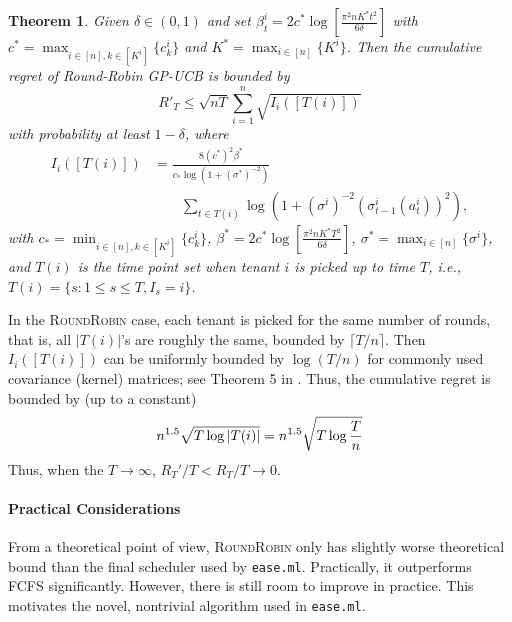 \documentclass[letterpaper]{vldb}
\newcommand{\eml}{\texttt{ease.ml}\xspace}
\newcommand{\rr}{\textsc{RoundRobin}\xspace}
\newtheorem{theorem}{Theorem}
\begin{document}
\vspace{-0.5em}
\begin{theorem}
  \label{thm:rr}
  Given $\delta\in (0,1)$ and set $\beta_t^i = 2c^\ast \log\left[\frac{\pi^2 n K^\ast t^2}{6\delta}\right]$ with $c^\ast = \max_{i\in [n], k\in [K^i]}\{c^i_k\}$ and $K^\ast = \max_{i\in [n]}\{K^i\}$. Then the
  cumulative regret of Round-Robin GP-UCB is bounded by
  \[
     R'_T \leq \sqrt{n T}\sum_{i=1}^n \sqrt{I_i([T(i)])}
  \]
  with probability at least $1-\delta$,
  where
  \begin{align*}
    I_i([T(i)]) & = \frac{8 (c^\ast)^2 \beta^\ast}{c_\ast \log(1 + (\sigma^\ast)^{-2})}\\
    &\qquad \sum_{t\in T(i)} \log\left(1 + (\sigma^i)^{-2}(\sigma^i_{t-1}(a^i_{t}))^2\right),
  \end{align*}
  with $c_\ast = \min_{i\in [n], k\in [K^i]}\{c^i_k\}$,  $\beta^\ast = 2c^\ast \log\left[\frac{\pi^2 n K^\ast T^2}{6\delta}\right]$, $\sigma^\ast= \max_{i\in [n]}\{\sigma^i\}$, and $T(i)$ is the time point set when tenant $i$ is picked up to time $T$, i.e.,
  $T(i) = \{s: 1\le s\le T, I_s = i\}$.
\end{theorem}

In the \rr case, each tenant is picked for the same number of rounds, that is, all $|T(i)|$'s are roughly the same, bounded by $\lceil T/n\rceil$. Then $I_i([T(i)])$ can be uniformly bounded by $\log (T/n)$ for commonly used covariance (kernel) matrices; see Theorem 5 in \cite{SrinivasKKS10}. Thus, the cumulative regret is bounded by (up to a constant) 
\begin{equation}
n^{1.5}\sqrt{T \log |T(i)|} = n^{1.5}\sqrt{T \log {T\over n}}
\label{eq:RR_simple_bound}
\end{equation}
Thus, when the $T \rightarrow \infty$,
$R_T'/T < R_T/T \rightarrow 0$.

\vspace{-0.5em}
\paragraph*{Practical Considerations}
From a theoretical point of view,
\rr only has slightly worse theoretical bound
than the final scheduler used by \eml.
Practically, it outperforms FCFS 
significantly. However, there is
still room to improve in practice. This
motivates the novel, nontrivial algorithm
used in \eml.
\end{document}
